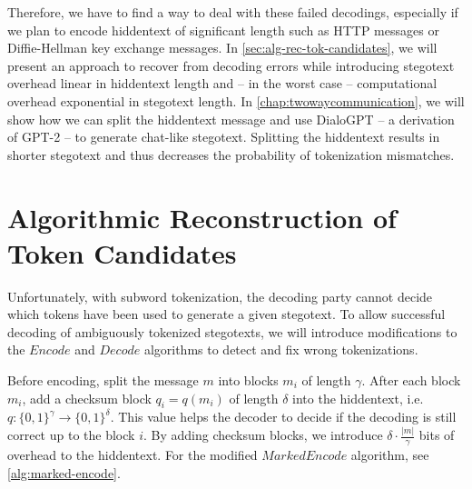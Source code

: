 
Therefore, we have to find a way to deal with these failed decodings, especially if we plan to encode hiddentext of significant length such as HTTP messages or Diffie-Hellman key exchange messages.
In \autoref{sec:alg-rec-tok-candidates}, we will present an approach to recover from decoding errors while introducing stegotext overhead linear in hiddentext length and -- in the worst case -- computational overhead exponential in stegotext length.
In \autoref{chap:twowaycommunication}, we will show how we can split the hiddentext message and use DialoGPT -- a derivation of GPT-2 -- to generate chat-like stegotext.
Splitting the hiddentext results in shorter stegotext and thus decreases the probability of tokenization mismatches.



\section{Algorithmic Reconstruction of Token Candidates}
\label{sec:alg-rec-tok-candidates}

Unfortunately, with subword tokenization, the decoding party cannot decide which tokens have been used to generate a given stegotext.
To allow successful decoding of ambiguously tokenized stegotexts, we will introduce modifications to the $Encode$ and $Decode$ algorithms to detect and fix wrong tokenizations.

Before encoding, split the message $m$ into blocks $m_i$ of length $\gamma$.
After each block $m_i$, add a checksum block $q_i = q(m_i)$ of length $\delta$ into the hiddentext, i.e. $q \colon \{ 0,1 \}^\gamma \rightarrow \{ 0,1 \}^\delta$.
This value helps the decoder to decide if the decoding is still correct up to the block $i$.
By adding checksum blocks, we introduce $\delta \cdot \frac{|m|}{\gamma}$ bits of overhead to the hiddentext.
For the modified $MarkedEncode$ algorithm, see \autoref{alg:marked-encode}.

